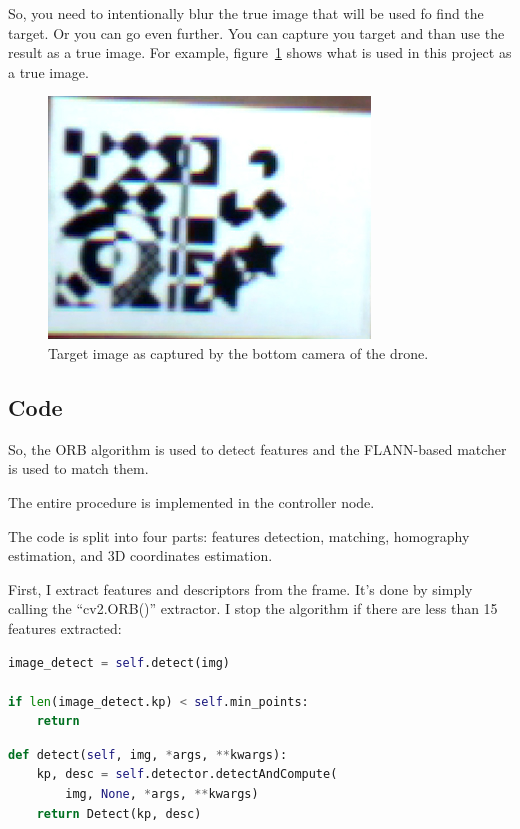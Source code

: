 \documentclass[12pt]{article}
\begin{document}
    So, you need to intentionally blur the true image that will be used
    fo find the target. Or you can go even further. You can capture
    you target and than use the result as a true image. For example,
    figure~\ref{fig:target_captured} shows what is used in this project
    as a true image.

    \begin{figure}[htbp]
        \noindent\centering
            \includegraphics[width=.3\textwidth]{target_captured.jpg}
        \caption{Target image as captured by the bottom camera of the drone.}
        \label{fig:target_captured}
    \end{figure}

    \subsection{Code}

    So, the ORB algorithm is used to detect features and the FLANN-based
    matcher is used to match them.

    The entire procedure is implemented in the controller node.
    
    The code is split into four parts:
    features detection, matching, homography estimation, and 3D coordinates
    estimation.

    First, I extract features and descriptors from the frame. It's done
    by simply calling the ``cv2.ORB()'' extractor.
    I stop the algorithm if there are less than 15 features extracted:

    \begin{lstlisting}[frame=single,language=Python]
image_detect = self.detect(img)

if len(image_detect.kp) < self.min_points:
    return
    \end{lstlisting}

    \begin{lstlisting}[frame=single,language=Python]
def detect(self, img, *args, **kwargs):
    kp, desc = self.detector.detectAndCompute(
        img, None, *args, **kwargs)
    return Detect(kp, desc)
    \end{lstlisting}
\end{document}
